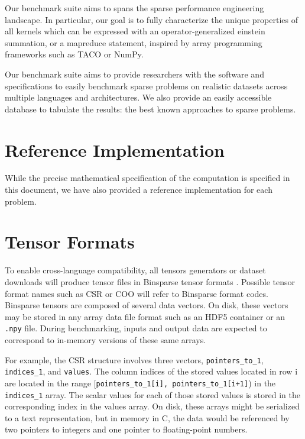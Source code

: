 \documentclass{article}
\begin{document}
Our benchmark suite aims to spans the sparse performance engineering landscape.
%
In particular, our goal is to fully characterize the unique properties of all kernels which can be expressed with an operator-generalized einstein summation, or a mapreduce statement, inspired by array programming frameworks such as TACO or NumPy.

Our benchmark suite aims to provide researchers with the software and specifications to easily benchmark sparse problems on realistic datasets across multiple languages and architectures. We also provide an easily accessible database to tabulate the results: the best known approaches to sparse problems.


\section{Reference Implementation}

While the precise mathematical specification of the computation is specified in this document, we have also provided a reference implementation for each problem.

\section{Tensor Formats} \label{sec:formats}

To enable cross-language compatibility, all tensors generators or dataset downloads will produce tensor files in Binsparse tensor formats \cite{noauthor_graphblasbinsparse-specification_nodate}. Possible tensor format names such as CSR or COO will refer to Binsparse format codes. Binsparse tensors are composed of several data vectors. On disk, these vectors may be stored in any array data file format such as an HDF5 container or an \texttt{.npy} file. During benchmarking, inputs and output data are expected to correspond to in-memory versions of these same arrays.

For example, the CSR structure involves three vectors, \texttt{pointers\_to\_1}, \texttt{indices\_1}, and \texttt{values}. The column indices of the stored values located in row i are located in the range [\texttt{pointers\_to\_1[i], pointers\_to\_1[i+1]}) in the \texttt{indices\_1} array. The scalar values for each of those stored values is stored in the corresponding index in the values array. On disk, these arrays might be serialized to a text representation, but in memory in C, the data would be referenced by two pointers to integers and one pointer to floating-point numbers.
\end{document}
